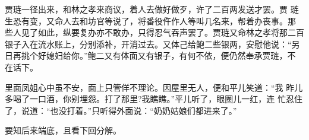 贾琏一径出来，和林之孝来商议，着人去做好做歹，许了二百两发送才罢。贾
琏生恐有变，又命人去和坊官等说了，将番役仵作人等叫几名来，帮着办丧事。那
些人见了如此，纵要复办亦不敢办，只得忍气吞声罢了。贾琏又命林之孝将那二百
银子入在流水账上，分别添补，开消过去。又体己给鲍二些银两，安慰他说：“另
日再挑个好媳妇给你。”鲍二又有体面又有银子，有何不依，便仍然奉承贾琏，不
在话下。

里面凤姐心中虽不安，面上只管佯不理论。因屋里无人，便和平儿笑道：“我
昨儿多喝了一口酒，你别埋怨。打了那里?我瞧瞧。”平儿听了，眼圈儿一红，连
忙忍住了，说道：“也没打着。”只听得外面说：“奶奶姑娘们都进来了。”

要知后来端底，且看下回分解。